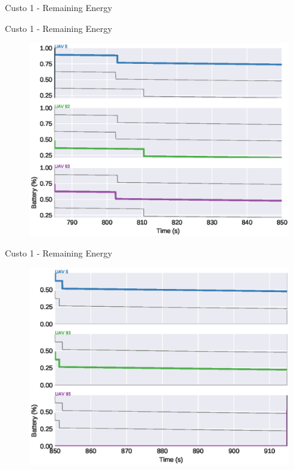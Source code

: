 \begin{frame}{Custo 1 - Remaining Energy}
\begin{figure}[!htb]
                    \end{figure}
                \end{frame}\begin{frame}{Custo 1 - Remaining Energy}
                    \begin{figure}[!htb]
                        \includegraphics[width=\textwidth]{custo_1/uav_remaining_energy_850.eps}
                    \end{figure}
                \end{frame}\begin{frame}{Custo 1 - Remaining Energy}
                    \begin{figure}[!htb]
                        \includegraphics[width=\textwidth]{custo_1/uav_remaining_energy_915.eps}

\end{figure}
\end{frame}
